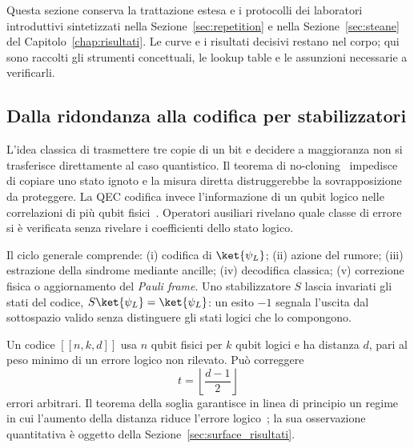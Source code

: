 \begin{onehalfspace}

Questa sezione conserva la trattazione estesa e i protocolli dei laboratori
introduttivi sintetizzati nella Sezione~\ref{sec:repetition} e nella
Sezione~\ref{sec:steane} del Capitolo~\ref{chap:risultati}. Le curve e i
risultati decisivi restano nel corpo; qui sono raccolti gli strumenti
concettuali, le lookup table e le assunzioni necessarie a verificarli.

\subsection{Dalla ridondanza alla codifica per stabilizzatori}
\label{app:qec_richiami}

L'idea classica di trasmettere tre copie di un bit e decidere a maggioranza
non si trasferisce direttamente al caso quantistico. Il teorema di
no-cloning~\cite{wootters1982} impedisce di copiare uno stato ignoto e la
misura diretta distruggerebbe la sovrapposizione da proteggere. La
\ac{QEC} codifica invece l'informazione di un qubit logico nelle
correlazioni di più qubit fisici~\cite{shorcorrection1995,steane1996,roffe2019}.
Operatori ausiliari rivelano quale classe di errore si è verificata senza
rivelare i coefficienti dello stato logico.

Il ciclo generale comprende: (i) codifica di $\ket{\psi_L}$; (ii) azione
del rumore; (iii) estrazione della sindrome mediante ancille; (iv)
decodifica classica; (v) correzione fisica o aggiornamento del \emph{Pauli
frame}. Uno stabilizzatore $S$ lascia invariati gli stati del codice,
$S\ket{\psi_L}=\ket{\psi_L}$: un esito $-1$ segnala l'uscita dal
sottospazio valido senza distinguere gli stati logici che lo compongono.

Un codice $[[n,k,d]]$ usa $n$ qubit fisici per $k$ qubit logici e ha
distanza $d$, pari al peso minimo di un errore logico non rilevato. Può
correggere
\begin{equation}
 t=\left\lfloor\frac{d-1}{2}\right\rfloor
 \label{eq:distanza_t}
\end{equation}
errori arbitrari. Il teorema della soglia garantisce in linea di principio
un regime in cui l'aumento della distanza riduce l'errore
logico~\cite{aharonov1997fault}; la sua osservazione quantitativa è oggetto
della Sezione~\ref{sec:surface_risultati}.


\end{onehalfspace}
